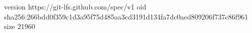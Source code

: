 version https://git-lfs.github.com/spec/v1
oid sha256:266bdd0f359c1d3a95f75d485aa3cd3191d134fa7dc0aed809206f737c86f961
size 21960
